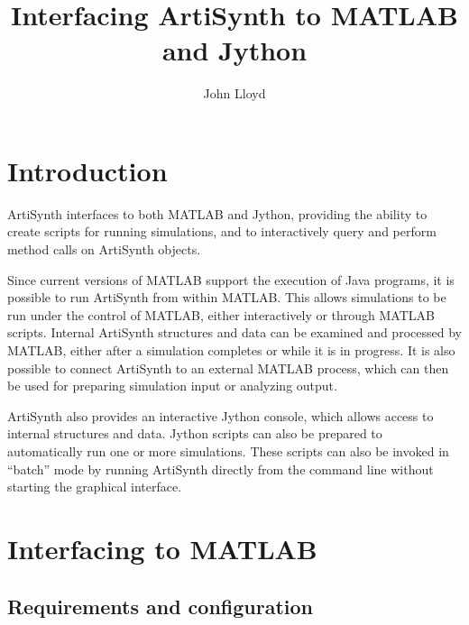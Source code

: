 \documentclass{article}
\begin{document}
\setcounter{tocdepth}{5}
\setcounter{secnumdepth}{3}

\title{Interfacing ArtiSynth to MATLAB and Jython}
\author{John Lloyd}

\iflatexml
\date{}
\fi

\maketitle

\iflatexml{\large\pubdate}\fi

\tableofcontents


\section{Introduction}

ArtiSynth interfaces to both MATLAB and Jython, providing the ability
to create scripts for running simulations, and to interactively query
and perform method calls on ArtiSynth objects.

Since current versions of MATLAB support the execution of Java
programs, it is possible to run ArtiSynth from within MATLAB.  This
allows simulations to be run under the control of MATLAB, either
interactively or through MATLAB scripts. Internal ArtiSynth structures
and data can be examined and processed by MATLAB, either after a
simulation completes or while it is in progress. It is also possible
to connect ArtiSynth to an external MATLAB process, which can then be
used for preparing simulation input or analyzing output.

ArtiSynth also provides an interactive Jython console, which allows
access to internal structures and data. Jython scripts can also be
prepared to automatically run one or more simulations. These scripts
can also be invoked in ``batch'' mode by running ArtiSynth directly
from the command line without starting the graphical interface.

\section{Interfacing to MATLAB}

\subsection{Requirements and configuration}
\end{document}
